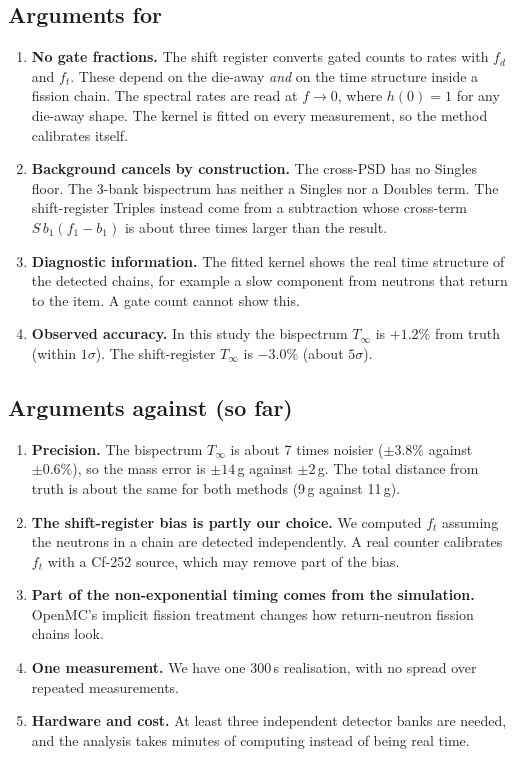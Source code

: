 \documentclass[11pt,a4paper]{article}
\newcommand{\Tinf}{T_\infty}
\begin{document}
\subsection{Arguments for}
\begin{enumerate}
  \item \textbf{No gate fractions.} The shift register converts gated counts to rates with
        $f_d$ and $f_t$. These depend on the die-away \emph{and} on the time structure
        inside a fission chain. The spectral rates are read at $f\to0$, where $h(0)=1$ for
        any die-away shape. The kernel is fitted on every measurement, so the method
        calibrates itself.
  \item \textbf{Background cancels by construction.} The cross-PSD has no Singles floor.
        The 3-bank bispectrum has neither a Singles nor a Doubles term. The shift-register
        Triples instead come from a subtraction whose cross-term $S\,b_1(f_1-b_1)$ is about
        three times larger than the result.
  \item \textbf{Diagnostic information.} The fitted kernel shows the real time structure of
        the detected chains, for example a slow component from neutrons that return to the
        item. A gate count cannot show this.
  \item \textbf{Observed accuracy.} In this study the bispectrum $\Tinf$ is $+1.2\%$ from
        truth (within $1\sigma$). The shift-register $\Tinf$ is $-3.0\%$ (about $5\sigma$).
\end{enumerate}

\subsection{Arguments against (so far)}
\begin{enumerate}
  \item \textbf{Precision.} The bispectrum $\Tinf$ is about 7 times noisier ($\pm3.8\%$ against
        $\pm0.6\%$), so the mass error is $\pm14$\,g against $\pm2$\,g. The total distance from
        truth is about the same for both methods (9\,g against 11\,g).
  \item \textbf{The shift-register bias is partly our choice.} We computed $f_t$ assuming the
        neutrons in a chain are detected independently. A real counter calibrates $f_t$ with
        a Cf-252 source, which may remove part of the bias.
  \item \textbf{Part of the non-exponential timing comes from the simulation.} OpenMC's
        implicit fission treatment changes how return-neutron fission chains look.
  \item \textbf{One measurement.} We have one 300\,s realisation, with no spread over
        repeated measurements.
  \item \textbf{Hardware and cost.} At least three independent detector banks are needed,
        and the analysis takes minutes of computing instead of being real time.
\end{enumerate}
\end{document}
